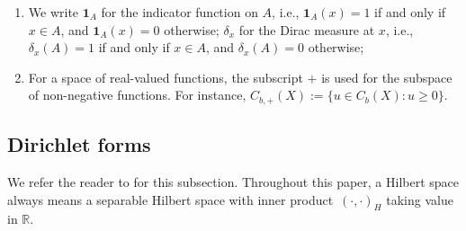 \documentclass[11pt,letterpaper]{amsart}
\newcommand{\T}{\tau} %
\newcommand{\eps}{\varepsilon}
\renewcommand{\complement}{\mathrm{c}}
\DeclareMathOperator{\eqdef}{\coloneqq}
\newcommand{\abs}[1]{\left\lvert#1\right\rvert}						%
\newcommand{\set}[1]{\left\{#1\right\}}							%
\newcommand{\Cb}{\mcC_b}									%
\newcommand{\Ccompl}{\mcC_\infty}									%
\newcommand{\Cbinfty}{{\mcC_{b}^{\infty}}}
\newcommand{\R}{{\mathbb R}}
\renewcommand{\1}{\mathbf 1}
\renewcommand{\msE}{\mathscr K}
\numberwithin{equation}{section}
\theoremstyle{plain}
\theoremstyle{definition}
\theoremstyle{remark}
\begin{document}
\begin{enumerate}[$(a)$]
\item We write $\1_{A}$ for the indicator function on $A$, i.e., $\1_{A}(x)=1$ if and only if $x \in A$, and $\1_A(x)=0$ otherwise; $\delta_x$ for the Dirac measure at $x$, i.e., $\delta_x(A)=1$ if and only if $x \in A$, and $\delta_{x}(A)=0$ otherwise;
\item For a space of real-valued functions, the subscript $+$ is used for the subspace of non-negative functions. For instance, $C_{b,+}(X):=\{u \in C_b(X): u \ge 0\}$. 
\end{enumerate}


\subsection{Dirichlet forms}
We refer the reader to \cite{MaRoe90, BouHir91} for this subsection. Throughout this paper, a Hilbert space always means a separable Hilbert space with inner product~$(\cdot, \cdot)_H$ taking value in $\R$. 
\end{document}
